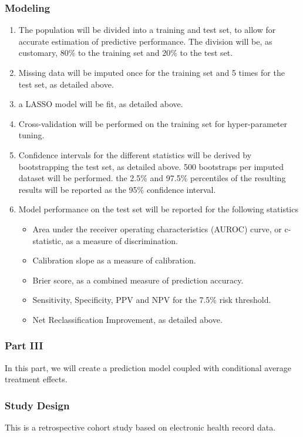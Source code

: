 \documentclass[a4paper,12pt]{article}
\begin{document}
		\subsubsection*{Modeling}
		\begin{enumerate}
			\item The population will be divided into a training and test set, to allow for accurate estimation of predictive performance. The division will be, as customary, 80\% to the training set and 20\% to the test set.
			\item Missing data will be imputed once for the training set and 5 times for the test set, as detailed above.
			\item a LASSO model will be fit, as detailed above.
			\item Cross-validation will be performed on the training set for hyper-parameter tuning.
			\item Confidence intervals for the different statistics will be derived by bootstrapping the test set, as detailed above. 500 bootstraps per imputed dataset will be performed. the 2.5\% and 97.5\% percentiles of the resulting results will be reported as the 95\% confidence interval.
			\item Model performance on the test set will be reported for the following statistics \cite{Steyerberg2008,FrankEHarrell2015}
			\begin{itemize}
				\item Area under the receiver operating characteristics (AUROC) curve, or c-statistic, as a measure of discrimination.
				\item Calibration slope as a measure of calibration.
				\item Brier score, as a combined measure of prediction accuracy.
				\item Sensitivity, Specificity, PPV and NPV for the 7.5\% risk threshold.
				\item Net Reclassification Improvement, as detailed above.
			\end{itemize}
		\end{enumerate}
		
		\subsubsection{Part III}
		In this part, we will create a prediction model coupled with conditional average treatment effects.
		
		\subsubsection*{Study Design}
		This is a retrospective cohort study based on electronic health record data.
		
\end{document}
